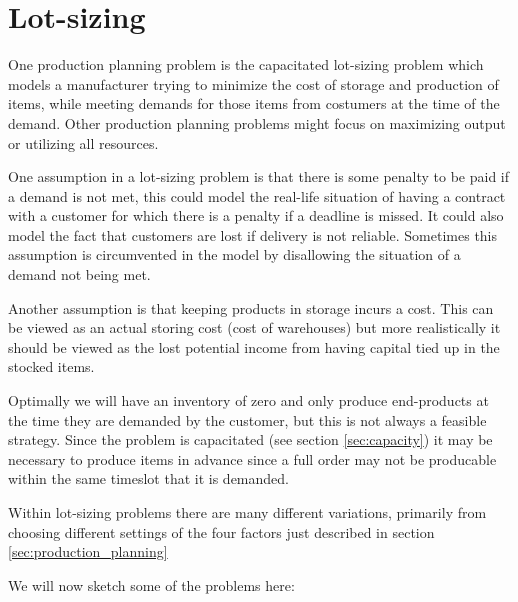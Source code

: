 \section{Lot-sizing}
\label{sec:lot_sizing_problem}
One production planning problem is the capacitated lot-sizing problem
which models a manufacturer trying to minimize the cost of storage and
production of items, while meeting demands for those items from
costumers at the time of the demand. Other production planning
problems might focus on maximizing output or utilizing all resources.

One assumption in a lot-sizing problem is that there is some penalty to be paid if
a demand is not met, this could model the real-life situation of
having a contract with a customer for which there is a penalty if a
deadline is missed. It could also model the fact that customers are
lost if delivery is not reliable. Sometimes this assumption is
circumvented in the model by disallowing the situation of a demand not
being met.

Another assumption is that keeping products in storage incurs a
cost. This can be viewed as an actual storing cost (cost of
warehouses) but more realistically it should be viewed as the lost
potential income from having capital tied up in the stocked items.

Optimally we will have an inventory of zero and only produce
end-products at the time they are demanded by the customer, but this
is not always a feasible strategy. Since the problem is capacitated
(see section \ref{sec:capacity}) it may be necessary to produce items
in advance since a full order may not be producable within the same
timeslot that it is demanded.

Within lot-sizing problems there are many different variations, primarily from
choosing different settings of the four factors just described in
section \ref{sec:production_planning}

We will now sketch some of the problems here:

